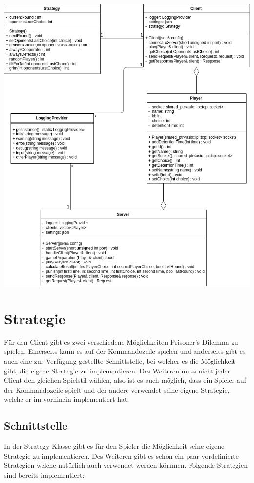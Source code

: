 \documentclass[12pt, letterpaper]{article}
\begin{document}
\includegraphics[width=\linewidth]{UML}

\section{Strategie}
Für den Client gibt es zwei verschiedene Möglichkeiten Prisoner's Dilemma zu spielen. Einerseits kann es auf der Kommandozeile spielen und anderseits gibt es auch eine zur Verfügung gestellte Schnittstelle, bei welcher es die Möglichkeit gibt, die eigene Strategie zu implementieren. Des Weiteren muss nicht jeder Client den gleichen Spielstil wählen, also ist es auch möglich, dass ein Spieler auf der Kommandozeile spielt und der andere verwendet seine eigene Strategie, welche er im vorhinein implementiert hat.

\subsection{Schnittstelle}
In der Strategy-Klasse gibt es für den Spieler die Möglichkeit seine eigene Strategie zu implementieren. Des Weiteren gibt es schon ein paar vordefinierte Strategien welche natürlich auch verwendet werden könnnen. Folgende Strategien sind bereits implementiert:
\end{document}
